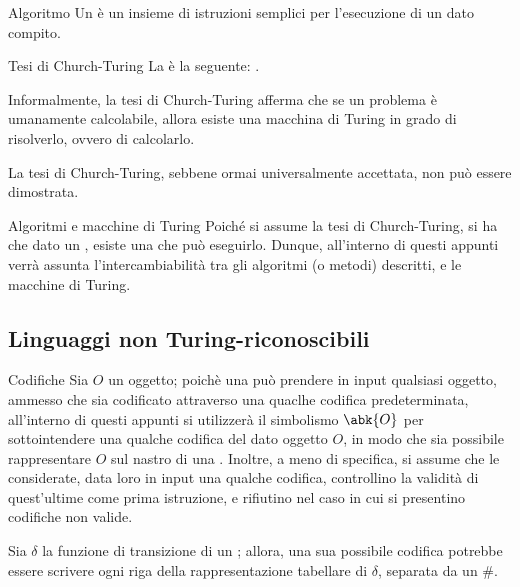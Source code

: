 \documentclass[a4paper, 12pt]{report}
\begin{document}
    \begin{frameddefn}{Algoritmo}
        Un  è un insieme di istruzioni semplici per l'esecuzione di un dato compito.
    \end{frameddefn}

    \begin{frameddefn}{Tesi di Church-Turing}
        La  è la seguente: .

        Informalmente, la tesi di Church-Turing afferma che se un problema è umanamente calcolabile, allora esiste una macchina di Turing in grado di risolverlo, ovvero di calcolarlo.

        La tesi di Church-Turing, sebbene ormai universalmente accettata, non può essere dimostrata.
    \end{frameddefn}

    \begin{framedobs}[label={alg tm}]{Algoritmi e macchine di Turing}
        Poiché si assume la tesi di Church-Turing, si ha che dato un , esiste una  che può eseguirlo. Dunque, all'interno di questi appunti verrà assunta l'intercambiabilità tra gli algoritmi (o metodi) descritti, e le macchine di Turing.
    \end{framedobs}

    \subsection{Linguaggi non Turing-riconoscibili}
    
    \begin{framedobs}{Codifiche}
        Sia $O$ un oggetto; poichè una \TM può prendere in input qualsiasi oggetto, ammesso che sia codificato attraverso una quaclhe codifica predeterminata, all'interno di questi appunti si utilizzerà il simbolismo $\abk{O}$ per sottointendere una qualche codifica del dato oggetto $O$, in modo che sia possibile rappresentare $O$ sul nastro di una \TM. Inoltre, a meno di specifica, si assume che le \TM considerate, data loro in input una qualche codifica, controllino la validità di quest'ultime come prima istruzione, e rifiutino nel caso in cui si presentino codifiche non valide.
    \end{framedobs}

    \begin{example}
        Sia $\delta$ la funzione di transizione di un \DFA; allora, una sua possibile codifica potrebbe essere scrivere ogni riga della rappresentazione tabellare di $\delta$, separata da un \ttt \#.
    \end{example}
\end{document}
